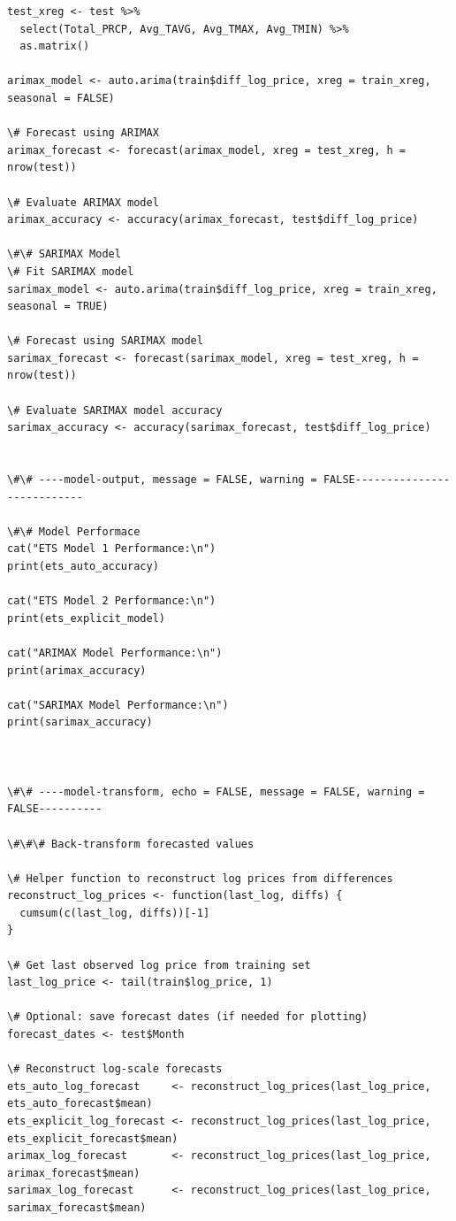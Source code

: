 \documentclass[
  letterpaper,
  DIV=11,
  numbers=noendperiod]{scrartcl}
\begin{document}
\begin{verbatim}
test_xreg <- test %>% 
  select(Total_PRCP, Avg_TAVG, Avg_TMAX, Avg_TMIN) %>% 
  as.matrix()

arimax_model <- auto.arima(train$diff_log_price, xreg = train_xreg, seasonal = FALSE)

\# Forecast using ARIMAX
arimax_forecast <- forecast(arimax_model, xreg = test_xreg, h = nrow(test))

\# Evaluate ARIMAX model
arimax_accuracy <- accuracy(arimax_forecast, test$diff_log_price)

\#\# SARIMAX Model
\# Fit SARIMAX model
sarimax_model <- auto.arima(train$diff_log_price, xreg = train_xreg, seasonal = TRUE)

\# Forecast using SARIMAX model
sarimax_forecast <- forecast(sarimax_model, xreg = test_xreg, h = nrow(test))

\# Evaluate SARIMAX model accuracy
sarimax_accuracy <- accuracy(sarimax_forecast, test$diff_log_price)


\#\# ----model-output, message = FALSE, warning = FALSE---------------------------

\#\# Model Performace
cat("ETS Model 1 Performance:\n")
print(ets_auto_accuracy)

cat("ETS Model 2 Performance:\n")
print(ets_explicit_model)

cat("ARIMAX Model Performance:\n")
print(arimax_accuracy)

cat("SARIMAX Model Performance:\n")
print(sarimax_accuracy)



\#\# ----model-transform, echo = FALSE, message = FALSE, warning = FALSE----------

\#\#\# Back-transform forecasted values

\# Helper function to reconstruct log prices from differences
reconstruct_log_prices <- function(last_log, diffs) {
  cumsum(c(last_log, diffs))[-1]
}

\# Get last observed log price from training set
last_log_price <- tail(train$log_price, 1)

\# Optional: save forecast dates (if needed for plotting)
forecast_dates <- test$Month

\# Reconstruct log-scale forecasts
ets_auto_log_forecast     <- reconstruct_log_prices(last_log_price, ets_auto_forecast$mean)
ets_explicit_log_forecast <- reconstruct_log_prices(last_log_price, ets_explicit_forecast$mean)
arimax_log_forecast       <- reconstruct_log_prices(last_log_price, arimax_forecast$mean)
sarimax_log_forecast      <- reconstruct_log_prices(last_log_price, sarimax_forecast$mean)


\end{verbatim}
\end{document}
